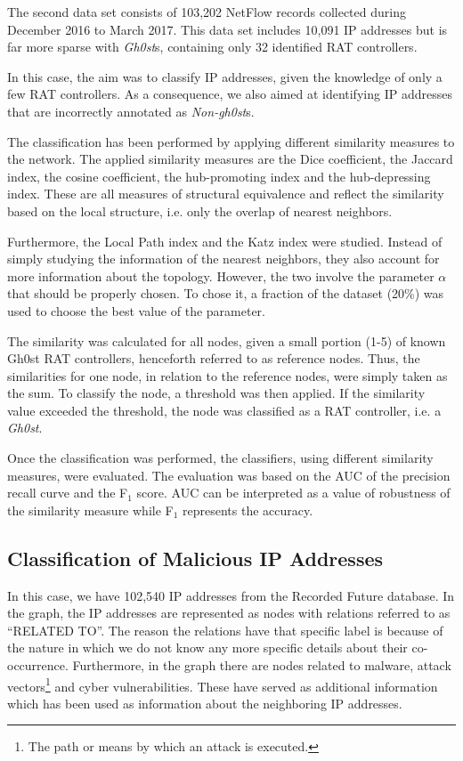 The second data set consists of 103,202 NetFlow records collected during December 2016 to March 2017. This data set includes 10,091 IP addresses but is far more sparse with \textit{Gh0st}s, containing only 32 identified RAT controllers. 

In this case, the aim was to classify IP addresses, given the knowledge of only a few RAT controllers. As a consequence, we also aimed at identifying IP addresses that are incorrectly annotated as \textit{Non-gh0st}s. 

The classification has been performed by applying different similarity measures to the network. The applied similarity measures are the Dice coefficient, the Jaccard index, the cosine coefficient, the hub-promoting index and the hub-depressing index. These are all measures of structural equivalence and reflect the similarity based on the local structure, i.e. only the overlap of nearest neighbors.

Furthermore, the Local Path index and the Katz index were studied. Instead of simply studying the information of the nearest neighbors, they also account for more information about the topology. However, the two involve the parameter $\alpha$ that should be properly chosen. To chose it, a fraction of the dataset (20\%) was used to choose the best value of the parameter. 

The similarity was calculated for all nodes, given a small portion (1-5) of known Gh0st RAT controllers, henceforth referred to as reference nodes. Thus, the similarities for one node, in relation to the reference nodes, were simply taken as the sum. To classify the node, a threshold was then applied. If the similarity value exceeded the threshold, the node was classified as a RAT controller, i.e. a \textit{Gh0st}.

Once the classification was performed, the classifiers, using different similarity measures, were evaluated. The evaluation was based on the AUC of the precision recall curve and the F$_1$ score. AUC can be interpreted as a value of robustness of the similarity measure while F$_1$ represents the accuracy.

\subsection{Classification of Malicious IP Addresses \label{methodSVM}}
In this case, we have 102,540 IP addresses from the Recorded Future database. In the graph, the IP addresses are represented as nodes with relations referred to as ``RELATED TO''. The reason the relations have that specific label is because of the nature in which we do not know any more specific details about their co-occurrence. Furthermore, in the graph there are nodes related to malware, attack vectors\footnote{The path or means by which an attack is executed.} and cyber vulnerabilities. These have served as additional information which has been used as information about the neighboring IP addresses.

